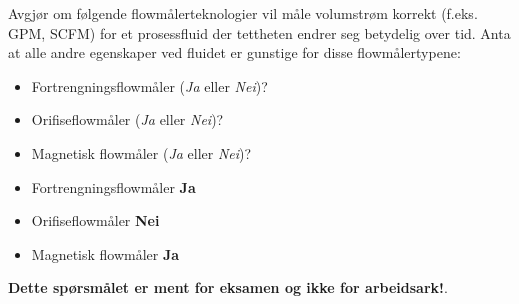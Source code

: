 

Avgjør om følgende flowmålerteknologier vil måle volumstrøm korrekt (f.eks. GPM, SCFM) for et prosessfluid der tettheten endrer seg betydelig over tid. Anta at alle andre egenskaper ved fluidet er gunstige for disse flowmålertypene:

\begin{itemize}
\item{} Fortrengningsflowmåler ({\it Ja} eller {\it Nei})?
\vskip 10pt
\item{} Orifiseflowmåler ({\it Ja} eller {\it Nei})?
\vskip 10pt
\item{} Magnetisk flowmåler ({\it Ja} eller {\it Nei})?
\end{itemize}







\begin{itemize}
\item{} Fortrengningsflowmåler {\bf Ja}
\item{} Orifiseflowmåler {\bf Nei}
\item{} Magnetisk flowmåler {\bf Ja}
\end{itemize}







{\bf Dette spørsmålet er ment for eksamen og ikke for arbeidsark!}.



